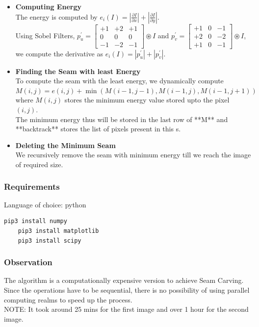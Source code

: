 \begin{itemize}

	\item \textbf{Computing Energy} \\
The energy is computed by $e_i(I)=\left|\frac{\partial I}{\partial x}\right| + \left|\frac{\partial I}{\partial y}\right|$. \\
Using Sobel Filters, 
$p^{\prime}_u = \begin{bmatrix} +1 & +2 & +1\\ 0 & 0 & 0 \\ -1 & -2 & -1 \end{bmatrix} \circledast I$ and 
$p^{\prime}_v = \begin{bmatrix} +1 & 0 & -1\\ +2 & 0 & -2 \\ +1 & 0 & -1 \end{bmatrix} \circledast I$, we compute the derivative as $e_i(I)=\left|p^{\prime}_u\right| + \left|p^{\prime}_v\right|$.

	\item \textbf{Finding the Seam with least Energy} \\
To compute the seam with the least energy, we dynamically compute $M\left(i,j\right)=e\left(i,j\right)+\min\left( M\left(i-1,j-1\right), M\left(i-1,j\right), M\left(i-1,j+1\right)\right)$ where $M\left(i,j\right)$ stores the minimum energy value stored upto the pixel $\left(i,j\right)$.\\
The minimum energy thus will be stored in the last row of **M** and **backtrack** stores the list of pixels present in this s.

	\item \textbf{Deleting the Minimum Seam} \\
We recursively remove the seam with minimum energy till we reach the image of required size.
\end{itemize}

\subsubsection{Requirements}
Language of choice: python
\begin{lstlisting}[language=bash]
	pip3 install numpy
	pip3 install matplotlib
	pip3 install scipy
\end{lstlisting}

\subsubsection{Observation}
The algorithm is a computationally expensive version to achieve Seam Carving. Since the operations have to be sequential, there is no possibility of using parallel computing realms to speed up the process.\\
NOTE: It took around 25 mins for the first image and over 1 hour for the second image.

